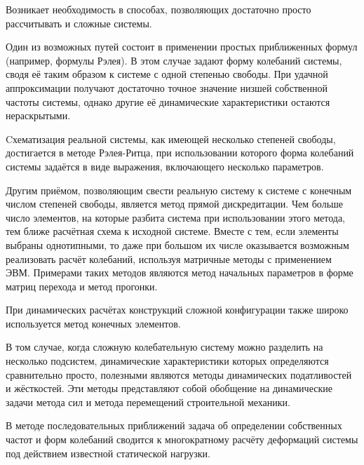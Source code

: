 Возникает необходимость в способах, позволяющих достаточно просто рассчитывать и сложные системы.

Один из возможных путей состоит в применении простых приближенных формул (например, формулы Рэлея). В этом случае задают форму колебаний системы, сводя её таким образом к системе с одной степенью свободы. При удачной аппроксимации получают достаточно точное значение низшей собственной частоты системы, однако другие её динамические характеристики остаются нераскрытыми.

Cхематизация реальной системы, как имеющей несколько степеней свободы, достигается в методе Рэлея-Ритца, при использовании которого форма колебаний системы задаётся в виде выражения, включающего несколько параметров.

Другим приёмом, позволяющим свести реальную систему к системе с конечным числом степеней свободы, является метод прямой дискредитации. Чем больше число элементов, на которые разбита система при использовании этого метода, тем ближе расчётная схема к исходной системе. Вместе с тем, если элементы выбраны однотипными, то даже при большом их числе оказывается возможным реализовать расчёт колебаний, используя матричные методы с применением ЭВМ. Примерами таких методов являются метод начальных параметров в форме матриц перехода и метод прогонки.

При динамических расчётах конструкций сложной конфигурации также широко используется метод конечных элементов.

В том случае, когда сложную колебательную систему можно разделить на несколько подсистем, динамические характеристики которых определяются сравнительно просто, полезными являются методы динамических податливостей и жёсткостей. Эти методы представляют собой обобщение на динамические задачи метода сил и метода перемещений строительной механики.

В методе последовательных приближений задача об определении собственных частот и форм колебаний сводится к многократному расчёту деформаций системы под действием известной статической нагрузки.
